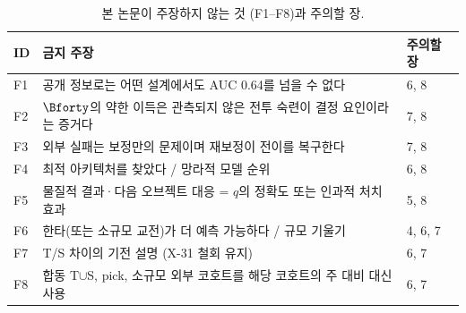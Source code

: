 \begin{table}[htbp]
  \centering
  \caption{본 논문이 주장하지 않는 것 (F1--F8)과 주의할 장.}
  \label{tab:forbidden}
  \small
  \begin{tabularx}{\linewidth}{@{}lXl@{}}
    \toprule
    ID & 금지 주장 & 주의할 장 \\
    \midrule
    F1 & 공개 정보로는 어떤 설계에서도 AUC 0.64를 넘을 수 없다 & 6, 8 \\
    F2 & $\Bforty$의 약한 이득은 관측되지 않은 전투 숙련이 결정 요인이라는 증거다 & 7, 8 \\
    F3 & 외부 실패는 보정만의 문제이며 재보정이 전이를 복구한다 & 7, 8 \\
    F4 & 최적 아키텍처를 찾았다 / 망라적 모델 순위 & 6, 8 \\
    F5 & 물질적 결과·다음 오브젝트 대응 = $q$의 정확도 또는 인과적 처치 효과 & 5, 8 \\
    F6 & 한타(또는 소규모 교전)가 더 예측 가능하다 / 규모 기울기 & 4, 6, 7 \\
    F7 & T/S 차이의 기전 설명 (X-31 철회 유지) & 6, 7 \\
    F8 & 합동 T$\cup$S, pick, 소규모 외부 코호트를 해당 코호트의 주 대비 대신 사용 & 6, 7 \\
    \bottomrule
  \end{tabularx}
\end{table}
